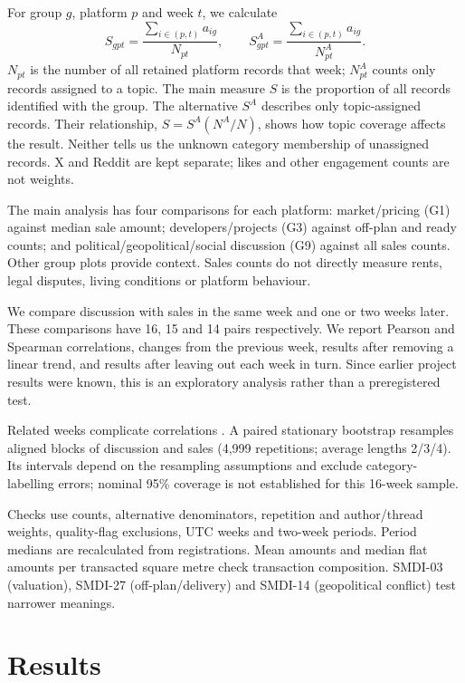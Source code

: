 \documentclass[graybox]{svmult}
\begin{document}
For group $g$, platform $p$ and week $t$, we calculate
\begin{equation}
S_{gpt}=\frac{\sum_{i\in(p,t)}a_{ig}}{N_{pt}},\qquad
S^{A}_{gpt}=\frac{\sum_{i\in(p,t)}a_{ig}}{N^{A}_{pt}}.\label{eq:smdi}
\end{equation}
$N_{pt}$ is the number of all retained platform records that week; $N^A_{pt}$ counts only records assigned to a topic. The main measure $S$ is the proportion of all records identified with the group. The alternative $S^A$ describes only topic-assigned records. Their relationship, $S=S^A(N^A/N)$, shows how topic coverage affects the result. Neither tells us the unknown category membership of unassigned records. X and Reddit are kept separate; likes and other engagement counts are not weights.

The main analysis has four comparisons for each platform: market/pricing (G1) against median sale amount; developers/projects (G3) against off-plan and ready counts; and political/geopolitical/social discussion (G9) against all sales counts. Other group plots provide context. Sales counts do not directly measure rents, legal disputes, living conditions or platform behaviour.

We compare discussion with sales in the same week and one or two weeks later. These comparisons have 16, 15 and 14 pairs respectively. We report Pearson and Spearman correlations, changes from the previous week, results after removing a linear trend, and results after leaving out each week in turn. Since earlier project results were known, this is an exploratory analysis rather than a preregistered test.

Related weeks complicate correlations \cite{rankcorrelation}. A paired stationary bootstrap \cite{bootstrap} resamples aligned blocks of discussion and sales (4,999 repetitions; average lengths 2/3/4). Its intervals depend on the resampling assumptions and exclude category-labelling errors; nominal 95\% coverage is not established for this 16-week sample.

Checks use counts, alternative denominators, repetition and author/thread weights, quality-flag exclusions, UTC weeks and two-week periods. Period medians are recalculated from registrations. Mean amounts and median flat amounts per transacted square metre check transaction composition. SMDI-03 (valuation), SMDI-27 (off-plan/delivery) and SMDI-14 (geopolitical conflict) test narrower meanings.

\section{Results}
\end{document}
